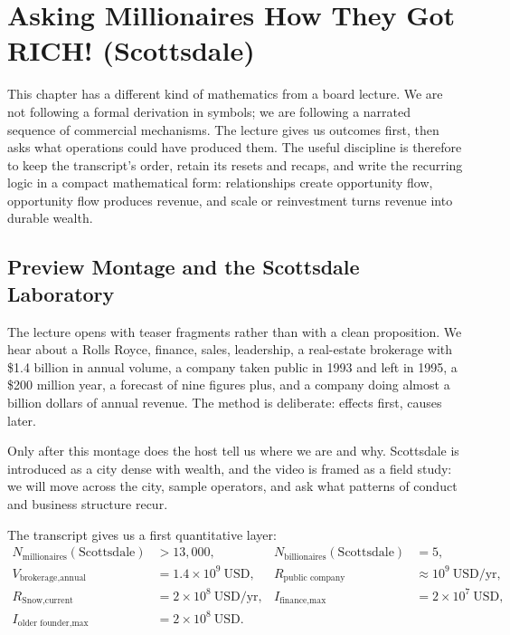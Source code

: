 \chapter{Asking Millionaires How They Got RICH! (Scottsdale)}

This chapter has a different kind of mathematics from a board lecture. We are not following a formal derivation in symbols; we are following a narrated sequence of commercial mechanisms. The lecture gives us outcomes first, then asks what operations could have produced them. The useful discipline is therefore to keep the transcript's order, retain its resets and recaps, and write the recurring logic in a compact mathematical form: relationships create opportunity flow, opportunity flow produces revenue, and scale or reinvestment turns revenue into durable wealth.

\section{Preview Montage and the Scottsdale Laboratory}

The lecture opens with teaser fragments rather than with a clean proposition. We hear about a Rolls Royce, finance, sales, leadership, a real-estate brokerage with \$1.4 billion in annual volume, a company taken public in 1993 and left in 1995, a \$200 million year, a forecast of nine figures plus, and a company doing almost a billion dollars of annual revenue. The method is deliberate: effects first, causes later.

Only after this montage does the host tell us where we are and why. Scottsdale is introduced as a city dense with wealth, and the video is framed as a field study: we will move across the city, sample operators, and ask what patterns of conduct and business structure recur.

The transcript gives us a first quantitative layer:
\begin{align}
N_{\text{millionaires}}(\text{Scottsdale}) &> 13{,}000, &
N_{\text{billionaires}}(\text{Scottsdale}) &= 5, \\
V_{\text{brokerage,annual}} &= 1.4\times 10^9\ \text{USD}, &
R_{\text{public company}} &\approx 10^9\ \text{USD/yr}, \\
R_{\text{Snow,current}} &= 2\times 10^8\ \text{USD/yr}, &
I_{\text{finance,max}} &= 2\times 10^7\ \text{USD}, \\
I_{\text{older founder,max}} &= 2\times 10^8\ \text{USD}. &&
\end{align}

